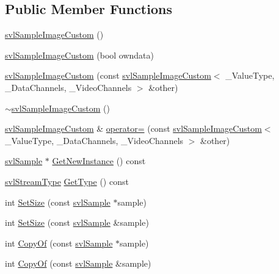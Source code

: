 \subsection*{Public Member Functions}
\begin{DoxyCompactItemize}
\item 
\hyperlink{classsvl_sample_image_custom_a86f142472177a135cb61356844af0469}{svl\+Sample\+Image\+Custom} ()
\item 
\hyperlink{classsvl_sample_image_custom_ac35ed25ee803ef4f9fdc4e943218c086}{svl\+Sample\+Image\+Custom} (bool owndata)
\item 
\hyperlink{classsvl_sample_image_custom_a24e50aadebb3d4248927c67c08697419}{svl\+Sample\+Image\+Custom} (const \hyperlink{classsvl_sample_image_custom}{svl\+Sample\+Image\+Custom}$<$ \+\_\+\+Value\+Type, \+\_\+\+Data\+Channels, \+\_\+\+Video\+Channels $>$ \&other)
\item 
\hyperlink{classsvl_sample_image_custom_a80105437289d7effcb730c4a86b0d09b}{$\sim$svl\+Sample\+Image\+Custom} ()
\item 
\hyperlink{classsvl_sample_image_custom}{svl\+Sample\+Image\+Custom} \& \hyperlink{classsvl_sample_image_custom_a279b02550bf93dde5d65f1baf99392fd}{operator=} (const \hyperlink{classsvl_sample_image_custom}{svl\+Sample\+Image\+Custom}$<$ \+\_\+\+Value\+Type, \+\_\+\+Data\+Channels, \+\_\+\+Video\+Channels $>$ \&other)
\item 
\hyperlink{classsvl_sample}{svl\+Sample} $\ast$ \hyperlink{classsvl_sample_image_custom_aeb7b03acbcec862fc59c6dcac98209b0}{Get\+New\+Instance} () const 
\item 
\hyperlink{svl_definitions_8h_aa00696d338a58db361335a01fd11e122}{svl\+Stream\+Type} \hyperlink{classsvl_sample_image_custom_a07cb7b6e330adc6332fc334283f2b70d}{Get\+Type} () const 
\item 
int \hyperlink{classsvl_sample_image_custom_a67274b637cf728989b840642d9947c22}{Set\+Size} (const \hyperlink{classsvl_sample}{svl\+Sample} $\ast$sample)
\item 
int \hyperlink{classsvl_sample_image_custom_af573cdf05b8b2bc88fa059e9e01c1bde}{Set\+Size} (const \hyperlink{classsvl_sample}{svl\+Sample} \&sample)
\item 
int \hyperlink{classsvl_sample_image_custom_add5fb5b28b462591ee5920ae62cb59f3}{Copy\+Of} (const \hyperlink{classsvl_sample}{svl\+Sample} $\ast$sample)
\item 
int \hyperlink{classsvl_sample_image_custom_ab84806d39cdabe6d0e3cdd8edad4ee5e}{Copy\+Of} (const \hyperlink{classsvl_sample}{svl\+Sample} \&sample)

\end{DoxyCompactItemize}
